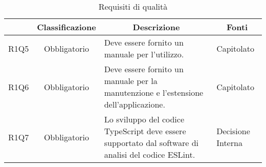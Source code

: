 \begin{table}[H]
    \centering
    \renewcommand{\arraystretch}{1.8}
    \begin{tabular}{c | c | p{6cm} | p{4.1cm}}
        \rowcolor[HTML]{125E28}
        \multicolumn{1}{c}{\color[HTML]{FFFFFF} \textbf{Codice}}          &
        \multicolumn{1}{c}{\color[HTML]{FFFFFF} \textbf{Classificazione}} &
        \multicolumn{1}{c}{\color[HTML]{FFFFFF} \textbf{Descrizione}}     &
        \multicolumn{1}{c}{\color[HTML]{FFFFFF} \textbf{Fonti}}                                                                                                                                                                   \\
        \hline
        R1Q5                                                              & Obbligatorio & Deve essere fornito un manuale per l'utilizzo.                                                                  & Capitolato        \\
        R1Q6                                                              & Obbligatorio & Deve essere fornito un manuale per la manutenzione e l'estensione dell'applicazione.                            & Capitolato        \\
        R1Q7                                                              & Obbligatorio & Lo sviluppo del codice TypeScript\glo{} deve essere supportato dal software di analisi del codice ESLint\glo{}. & Decisione Interna \\
    \end{tabular}
    \caption{Requisiti di qualità}
\end{table}

